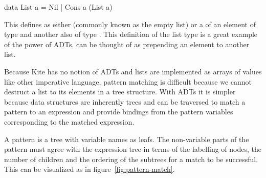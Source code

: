 \begin{haskell}
data List a = Nil | Cons a (List a)
\end{haskell}

This defines  as either  (commonly known as the empty list) or a  of an element of type  and another  also of type . This definition of the list type is a great example of the power of ADTs.  can be thought of as prepending an element to another list.

Because Kite has no notion of ADTs and lists are implemented as arrays of values like other imperative language, pattern matching is difficult because we cannot destruct a list to its elements in a tree structure. With ADTs it is simpler because data structures are inherently trees and can be traversed to match a pattern to an expression and provide bindings from the pattern variables corresponding to the matched expression.

A pattern is a tree with variable names as leafs. The non-variable parts of the pattern must agree with the expression tree in terms of the labelling of nodes, the number of children and the ordering of the subtrees\cite[p. 514]{wilhelm95} for a match to be successful. This can be visualized as in figure~\ref{fig:pattern-match}.

